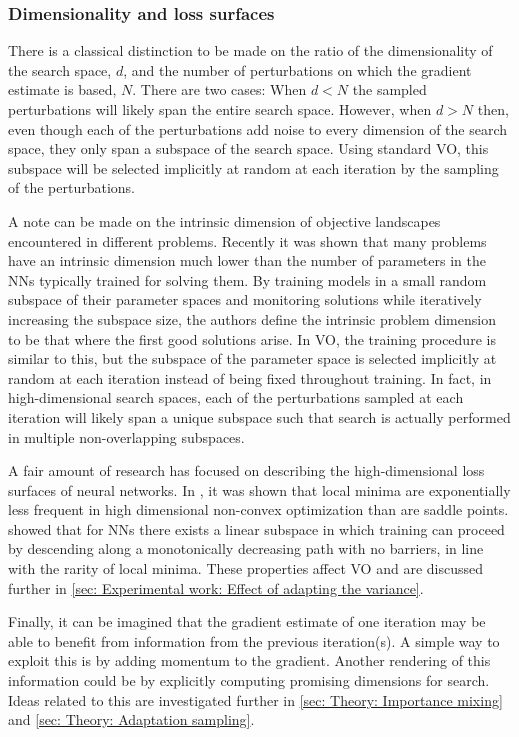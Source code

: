\subsubsection{Dimensionality and loss surfaces}\label{sec: Theory: Variational optimization: Remarks on dimensionality}
There is a classical distinction to be made on the ratio of the dimensionality of the search space, $d$, and the number of perturbations on which the gradient estimate is based, $N$. There are two cases: When $d<N$ the sampled perturbations will likely span the entire search space. However, when $d>N$ then, even though each of the perturbations add noise to every dimension of the search space, they only span a subspace of the search space. Using standard \gls{VO}, this subspace will be selected implicitly at random at each iteration by the sampling of the perturbations.

A note can be made on the intrinsic dimension of objective landscapes encountered in different problems. Recently \cite{Li2018a} it was shown that many problems have an intrinsic dimension much lower than the number of parameters in the \glspl{NN} typically trained for solving them. 
By training models in a small random subspace of their parameter spaces and monitoring solutions while iteratively increasing the subspace size, the authors define the intrinsic problem dimension to be that where the first good solutions arise. 
In \gls{VO}, the training procedure is similar to this, but the subspace of the parameter space is selected implicitly at random at each iteration instead of being fixed throughout training. In fact, in high-dimensional search spaces, each of the perturbations sampled at each iteration will likely span a unique subspace such that search is actually performed in multiple non-overlapping subspaces.

A fair amount of research has focused on describing the high-dimensional loss surfaces of neural networks.
In \cite{Dauphin2014}, it was shown that local minima are exponentially less frequent in high dimensional non-convex optimization than are saddle points.
\cite{Goodfellow2015} showed that for \glspl{NN} there exists a linear subspace in which training can proceed by descending along a monotonically decreasing path with no barriers, in line with the rarity of local minima. These properties affect \gls{VO} and are discussed further in \autoref{sec: Experimental work: Effect of adapting the variance}.

Finally, it can be imagined that the gradient estimate of one iteration may be able to benefit from information from the previous iteration(s). A simple way to exploit this is by adding momentum to the gradient. Another rendering of this information could be by explicitly computing promising dimensions for search. Ideas related to this are investigated further in \autoref{sec: Theory: Importance mixing} and \autoref{sec: Theory: Adaptation sampling}.




